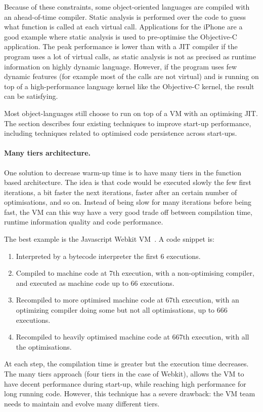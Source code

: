 \documentclass[a4paper,12pt,twoside]{../includes/ThesisStyle}
\begin{document}
Because of these constraints, some object-oriented languages are compiled with an ahead-of-time compiler. Static analysis is performed over the code to guess what function is called at each virtual call. Applications for the iPhone are a good example where static analysis is used to pre-optimise the Objective-C application. The peak performance is lower than with a JIT compiler if the program uses a lot of virtual calls, as static analysis is not as precised as runtime information on highly dynamic language. However, if the program uses few dynamic features (for example most of the calls are not virtual) and is running on top of a high-performance language kernel like the Objective-C kernel, the result can be satisfying.

Most object-languages still choose to run on top of a VM with an optimising JIT. The section describes four existing techniques to improve start-up performance, including techniques related to optimised code persistence across start-ups.

\paragraph{Many tiers architecture.}
One solution to decrease warm-up time is to have many tiers in the function based architecture. The idea is that code would be executed slowly the few first iterations, a bit faster the next iterations, faster after an certain number of optimisations, and so on. Instead of being slow for many iterations before being fast, the VM can this way have a very good trade off between compilation time, runtime information quality and code performance.

The best example is the Javascript Webkit VM~\cite{Webkit15}. A code snippet is:
\begin{enumerate}
\item Interpreted by a bytecode interpreter the first 6 executions.
\item Compiled to machine code at 7th execution, with a non-optimising compiler, and executed as machine code up to 66 executions.
\item Recompiled to more optimised machine code at 67th execution, with an optimizing compiler doing some but not all optimisations, up to 666 executions.
\item Recompiled to heavily optimised machine code at 667th execution, with all the optimisations.
\end{enumerate}

At each step, the compilation time is greater but the execution time decreases. The many tiers approach (four tiers in the case of Webkit), allows the VM to have decent performance during start-up, while reaching high performance for long running code. However, this technique has a severe drawback: the VM team needs to maintain and evolve many different tiers.
\end{document}
